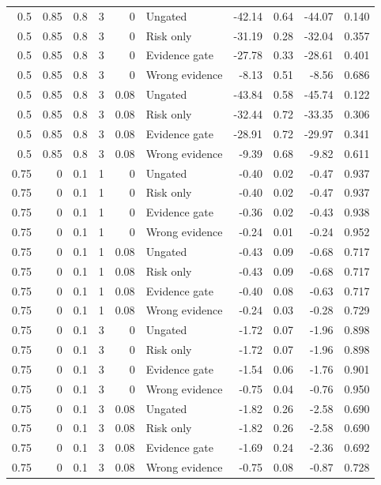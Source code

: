 \begin{longtable}{rrrrrlrrrr}
0.5 & 0.85 & 0.8 & 3 & 0 & Ungated & -42.14 & 0.64 & -44.07 & 0.140\\
0.5 & 0.85 & 0.8 & 3 & 0 & Risk only & -31.19 & 0.28 & -32.04 & 0.357\\
0.5 & 0.85 & 0.8 & 3 & 0 & Evidence gate & -27.78 & 0.33 & -28.61 & 0.401\\
0.5 & 0.85 & 0.8 & 3 & 0 & Wrong evidence & -8.13 & 0.51 & -8.56 & 0.686\\
0.5 & 0.85 & 0.8 & 3 & 0.08 & Ungated & -43.84 & 0.58 & -45.74 & 0.122\\
0.5 & 0.85 & 0.8 & 3 & 0.08 & Risk only & -32.44 & 0.72 & -33.35 & 0.306\\
0.5 & 0.85 & 0.8 & 3 & 0.08 & Evidence gate & -28.91 & 0.72 & -29.97 & 0.341\\
0.5 & 0.85 & 0.8 & 3 & 0.08 & Wrong evidence & -9.39 & 0.68 & -9.82 & 0.611\\
0.75 & 0 & 0.1 & 1 & 0 & Ungated & -0.40 & 0.02 & -0.47 & 0.937\\
0.75 & 0 & 0.1 & 1 & 0 & Risk only & -0.40 & 0.02 & -0.47 & 0.937\\
0.75 & 0 & 0.1 & 1 & 0 & Evidence gate & -0.36 & 0.02 & -0.43 & 0.938\\
0.75 & 0 & 0.1 & 1 & 0 & Wrong evidence & -0.24 & 0.01 & -0.24 & 0.952\\
0.75 & 0 & 0.1 & 1 & 0.08 & Ungated & -0.43 & 0.09 & -0.68 & 0.717\\
0.75 & 0 & 0.1 & 1 & 0.08 & Risk only & -0.43 & 0.09 & -0.68 & 0.717\\
0.75 & 0 & 0.1 & 1 & 0.08 & Evidence gate & -0.40 & 0.08 & -0.63 & 0.717\\
0.75 & 0 & 0.1 & 1 & 0.08 & Wrong evidence & -0.24 & 0.03 & -0.28 & 0.729\\
0.75 & 0 & 0.1 & 3 & 0 & Ungated & -1.72 & 0.07 & -1.96 & 0.898\\
0.75 & 0 & 0.1 & 3 & 0 & Risk only & -1.72 & 0.07 & -1.96 & 0.898\\
0.75 & 0 & 0.1 & 3 & 0 & Evidence gate & -1.54 & 0.06 & -1.76 & 0.901\\
0.75 & 0 & 0.1 & 3 & 0 & Wrong evidence & -0.75 & 0.04 & -0.76 & 0.950\\
0.75 & 0 & 0.1 & 3 & 0.08 & Ungated & -1.82 & 0.26 & -2.58 & 0.690\\
0.75 & 0 & 0.1 & 3 & 0.08 & Risk only & -1.82 & 0.26 & -2.58 & 0.690\\
0.75 & 0 & 0.1 & 3 & 0.08 & Evidence gate & -1.69 & 0.24 & -2.36 & 0.692\\
0.75 & 0 & 0.1 & 3 & 0.08 & Wrong evidence & -0.75 & 0.08 & -0.87 & 0.728\\

\end{longtable}
